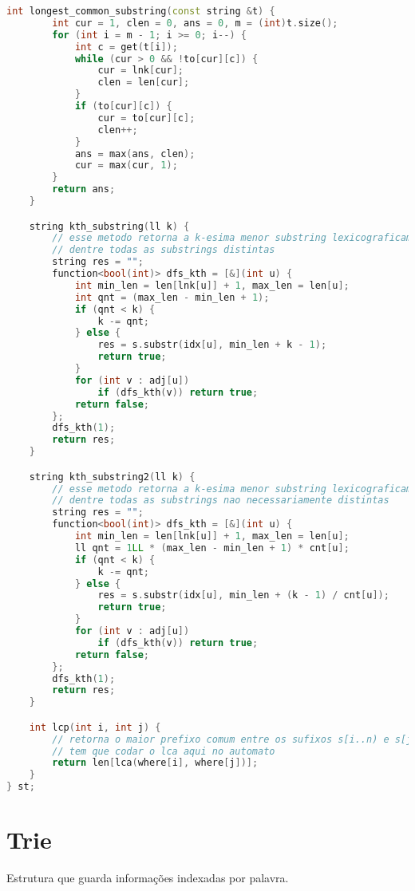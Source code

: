 \documentclass[10pt, a4paper, oneside]{book}
\begin{document}
\begin{lstlisting}[language=C++]
    int longest_common_substring(const string &t) {
        int cur = 1, clen = 0, ans = 0, m = (int)t.size();
        for (int i = m - 1; i >= 0; i--) {
            int c = get(t[i]);
            while (cur > 0 && !to[cur][c]) {
                cur = lnk[cur];
                clen = len[cur];
            }
            if (to[cur][c]) {
                cur = to[cur][c];
                clen++;
            }
            ans = max(ans, clen);
            cur = max(cur, 1);
        }
        return ans;
    }

    string kth_substring(ll k) {
        // esse metodo retorna a k-esima menor substring lexicograficamente,
        // dentre todas as substrings distintas
        string res = "";
        function<bool(int)> dfs_kth = [&](int u) {
            int min_len = len[lnk[u]] + 1, max_len = len[u];
            int qnt = (max_len - min_len + 1);
            if (qnt < k) {
                k -= qnt;
            } else {
                res = s.substr(idx[u], min_len + k - 1);
                return true;
            }
            for (int v : adj[u])
                if (dfs_kth(v)) return true;
            return false;
        };
        dfs_kth(1);
        return res;
    }

    string kth_substring2(ll k) {
        // esse metodo retorna a k-esima menor substring lexicograficamente,
        // dentre todas as substrings nao necessariamente distintas
        string res = "";
        function<bool(int)> dfs_kth = [&](int u) {
            int min_len = len[lnk[u]] + 1, max_len = len[u];
            ll qnt = 1LL * (max_len - min_len + 1) * cnt[u];
            if (qnt < k) {
                k -= qnt;
            } else {
                res = s.substr(idx[u], min_len + (k - 1) / cnt[u]);
                return true;
            }
            for (int v : adj[u])
                if (dfs_kth(v)) return true;
            return false;
        };
        dfs_kth(1);
        return res;
    }

    int lcp(int i, int j) {
        // retorna o maior prefixo comum entre os sufixos s[i..n) e s[j..n)
        // tem que codar o lca aqui no automato
        return len[lca(where[i], where[j])];
    }
} st;\end{lstlisting}
\hfill

\section{Trie}


Estrutura que guarda informações indexadas por palavra.   
\end{document}

